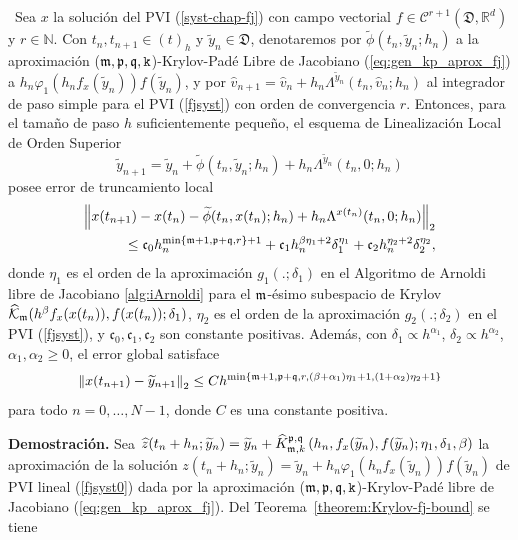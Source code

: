\begin{theorem}\label{theorem:kp-fj-llrk-convergence}
	\cite{naranjo2023jacobian}~Sea $x$ la solución del PVI (\ref{syst-chap-fj}) con campo vectorial $f\in \mathcal{C}^{r+1}(\mathfrak{D}, \mathbb{R}^d)$ y $r \in \mathbb{N}$.
	Con $t_n,t_{n+1}\in (t)_h$ y $\widetilde{y}_n \in \mathfrak{D}$, denotaremos por $\widetilde{\phi}(t_n,\widetilde{y}_n;h_n)$ a la aproximación ($\mathfrak{m},\mathfrak{p},\mathfrak{q},\mathtt{k}$)-Krylov-Padé Libre de Jacobiano (\ref{eq:gen_kp_aprox_fj}) a $h_n\varphi_1(h_nf_x(\widetilde{y}_n))f(\widetilde{y}_n)$, 
	y por $\widehat{v}_{n+1}=\widehat{v}_n+h_n\Lambda^{\widetilde{y}_n}(t_n,\widehat{v}_n;h_n)$ al integrador de paso simple para el PVI (\ref{fjsyst}) con orden de convergencia $r$. Entonces, para el tamaño de paso $h$ suficientemente pequeño, el esquema de Linealización Local de Orden Superior
	\begin{equation}
	\widetilde{y}_{n+1}= \widetilde{y}_n+\widetilde{\phi}(t_n,\widetilde{y}_n;h_n)+h_n\Lambda^{\widetilde{y}_n}(t_n,0;h_n) \label{JFKPHOLL}
	\end{equation}
	posee error de truncamiento local
	\begin{align}
	\left\lVert x(t_{n+1})-x(t_n)-\widetilde{\phi}(t_n,x(t_n);h_n)+h_n\Lambda^{x(t_n)}(t_n,0;h_n) \right\rVert_2 \\ \leq \mathfrak{c}_0h_n^{\min\{\mathfrak{m}+1,\mathfrak{p}+\mathfrak{q},r \}+1} + \mathfrak{c}_1h_n^{\beta\eta_1+2}\delta_1^{\eta_1} + \mathfrak{c}_2h_n^{\eta_2+2}\delta_2^{\eta_2}, \nonumber
	\end{align}
	donde $\eta_1$ es el orden de la aproximación $g_1(.;\delta_1)$ en el Algoritmo de Arnoldi libre de Jacobiano \ref{alg:iArnoldi} para el $\mathfrak{m}$-ésimo subespacio de Krylov $\widehat{\mathcal{K}}_{\mathfrak{m}}(h^\beta f_x(x(t_n)),f(x(t_n));\delta_1)$, $\eta_2$  es el orden de la aproximación $g_2(.;\delta_2)$ en el PVI (\ref{fjsyst}), y $\mathfrak{c}_0,\mathfrak{c}_1,\mathfrak{c}_2$ son constante positivas. 
	Además, con $\delta_1\propto h^{\alpha_1}$, $\delta_2\propto h^{\alpha_2}$, $\alpha_1,\alpha_2 \geq 0$, el error global satisface
	\[ \left\lVert x(t_{n+1})-\widetilde{y}_{n+1} \right\rVert_2\leq Ch^{\min\{\mathfrak{m}+1,\mathfrak{p}+\mathfrak{q},r,(\beta+\alpha_1)\eta_1+1,(1+\alpha_2)\eta_2+1\}} \]
	para todo $n=0,\ldots,N-1$, donde $C$ es una constante positiva.
\end{theorem}
\textbf{Demostración.} Sea $\widehat{z}(t_n+h_n;\widetilde{y}_n)=\widetilde{y}_n+\widehat{K}_{\mathfrak{m},k}^{\mathfrak{p},\mathfrak{q}}\left(h_n,f_x(\widetilde{y}_n), f(\widetilde{y}_n); \eta_1, \delta_1, \beta \right)$ la aproximación de la solución $z(t_n+h_n;\widetilde{y}_n)=\widetilde{y}_n+h_n\varphi_1(h_nf_x(\widetilde{y}_n))f(\widetilde{y}_n)$ de PVI lineal (\ref{fjsyst0}) dada por la aproximación ($\mathfrak{m},\mathfrak{p},\mathfrak{q},\mathtt{k}$)-Krylov-Padé libre de Jacobiano  (\ref{eq:gen_kp_aprox_fj}). Del Teorema~\ref{theorem:Krylov-fj-bound} se tiene
